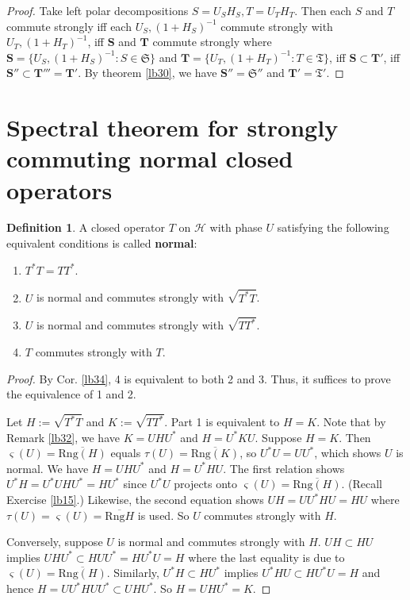 \documentclass[12pt,a4paper,notitlepage]{article}
\theoremstyle{definition}
\newtheorem{df}{Definition}[section]
\theoremstyle{plain}
\newcommand{\fk}{\mathfrak}
\newcommand{\mc}{\mathcal}
\newcommand{\ovl}{\overline}
\newcommand{\sgm}{\varsigma}
\newcommand{\mbf}{\mathbf}
\newcommand{\Rng}{\mathrm{Rng}}
\numberwithin{equation}{section}
\begin{document}
\begin{proof}
Take left polar decompositions $S=U_SH_S,T=U_TH_T$. Then each $S$ and $T$ commute strongly iff each $U_S,(1+H_S)^{-1}$ commute strongly with $U_T,(1+H_T)^{-1}$, iff $\mbf S$ and $\mbf T$ commute strongly where $\mbf S=\{U_S,(1+H_S)^{-1}:S\in\fk S\}$ and $\mbf T=\{U_T,(1+H_T)^{-1}:T\in\fk T\}$, iff $\mbf S\subset\mbf T'$, iff $\mbf S''\subset\mbf T'''=\mbf T'$. By theorem \ref{lb30}, we have $\mbf S''=\fk S''$ and $\mbf T'=\fk T'$.
\end{proof}









\section{Spectral theorem for strongly commuting normal closed operators}\label{lb66}


\begin{df}\label{lb52}
A closed operator $T$ on $\mc H$ with phase $U$ satisfying the following equivalent conditions is called \textbf{normal}:
\begin{enumerate}
\item $T^*T=TT^*$.
\item $U$ is normal and commutes strongly with $\sqrt{T^*T}$. 
\item $U$ is normal and commutes strongly with $\sqrt{TT^*}$. 
\item $T$ commutes strongly with $T$.
\end{enumerate}
\end{df}



\begin{proof}
By Cor. \ref{lb34}, 4 is equivalent to both 2 and 3. Thus, it suffices to prove the equivalence of 1 and 2. 

Let $H:=\sqrt {T^*T}$ and $K:=\sqrt{TT^*}$. Part 1 is equivalent to $H=K$. Note that by Remark \ref{lb32}, we have $K=UHU^*$ and $H=U^*KU$. Suppose $H=K$. Then $\sgm(U)=\ovl{\Rng(H)}$ equals $\tau(U)=\ovl{\Rng(K)}$, so $U^*U=UU^*$, which shows $U$ is normal. We have $H=UHU^*$ and $H=U^*HU$. The first relation shows $U^*H=U^*UHU^*=HU^*$ since $U^*U$ projects onto $\sgm(U)=\ovl{\Rng(H)}$. (Recall Exercise \ref{lb15}.) Likewise, the second equation shows $UH=UU^*HU=HU$ where $\tau(U)=\sgm(U)=\ovl{\Rng H}$ is used. So $U$ commutes strongly with $H$. 

Conversely, suppose $U$ is normal and commutes strongly with $H$. $UH\subset HU$ implies $UHU^*\subset HUU^*=HU^*U=H$ where the last equality is due to $\sgm(U)=\ovl{\Rng(H)}$. Similarly, $U^*H\subset HU^*$ implies $U^*HU\subset HU^*U=H$ and hence $H=UU^*HUU^*\subset UHU^*$. So $H=UHU^*=K$.
\end{proof}
\end{document}

